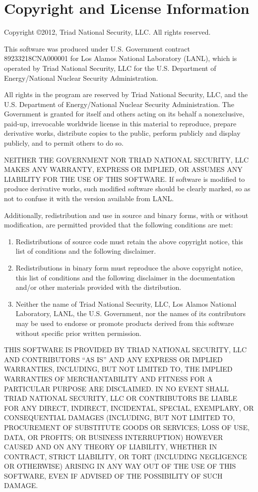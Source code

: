 \documentclass[11pt,letterpaper]{article}
\begin{document}
\section{Copyright and License Information}

Copyright \copyright 2012, Triad National Security, LLC.
All rights reserved.

This software was produced under U.S. Government contract
89233218CNA000001 for Los Alamos National Laboratory (LANL), which is
operated by Triad National Security, LLC for the U.S. Department of
Energy/National Nuclear Security Administration.

All rights in the program are reserved by Triad National Security, LLC,
and the U.S. Department of Energy/National Nuclear Security
Administration. The Government is granted for itself and others acting
on its behalf a nonexclusive, paid-up, irrevocable worldwide license in
this material to reproduce, prepare derivative works, distribute copies
to the public, perform publicly and display publicly, and to permit
others to do so.

NEITHER THE GOVERNMENT NOR TRIAD NATIONAL SECURITY, LLC MAKES ANY
WARRANTY, EXPRESS OR IMPLIED, OR ASSUMES ANY LIABILITY FOR THE USE OF
THIS SOFTWARE. If software is modified to produce derivative works,
such modified software should be clearly marked, so as not to confuse it
with the version available from LANL.

Additionally, redistribution and use in source and binary forms, with
or without modification, are permitted provided that the following
conditions are met:

\begin{enumerate}
\item Redistributions of source code must retain the above copyright
   notice, this list of conditions and the following disclaimer.
\item Redistributions in binary form must reproduce the above
   copyright notice, this list of conditions and the following
   disclaimer in the documentation and/or other materials provided
   with the distribution.
\item Neither the name of Triad National Security, LLC, Los Alamos
   National Laboratory, LANL, the U.S. Government, nor the names of its
   contributors may be used to endorse or promote products derived from
   this software without specific prior written permission.
\end{enumerate}

THIS SOFTWARE IS PROVIDED BY TRIAD NATIONAL SECURITY, LLC AND
CONTRIBUTORS ``AS IS'' AND ANY EXPRESS OR IMPLIED WARRANTIES, INCLUDING,
BUT NOT LIMITED TO, THE IMPLIED WARRANTIES OF MERCHANTABILITY AND FITNESS
FOR A PARTICULAR PURPOSE ARE DISCLAIMED. IN NO EVENT SHALL TRIAD
NATIONAL SECURITY, LLC OR CONTRIBUTORS BE LIABLE FOR ANY DIRECT,
INDIRECT, INCIDENTAL, SPECIAL, EXEMPLARY, OR CONSEQUENTIAL DAMAGES
(INCLUDING, BUT NOT LIMITED TO, PROCUREMENT OF SUBSTITUTE GOODS OR
SERVICES; LOSS OF USE, DATA, OR PROFITS; OR BUSINESS INTERRUPTION)
HOWEVER CAUSED AND ON ANY THEORY OF LIABILITY, WHETHER IN CONTRACT,
STRICT LIABILITY, OR TORT (INCLUDING NEGLIGENCE OR OTHERWISE) ARISING
IN ANY WAY OUT OF THE USE OF THIS SOFTWARE, EVEN IF ADVISED OF THE
POSSIBILITY OF SUCH DAMAGE.
\end{document}

